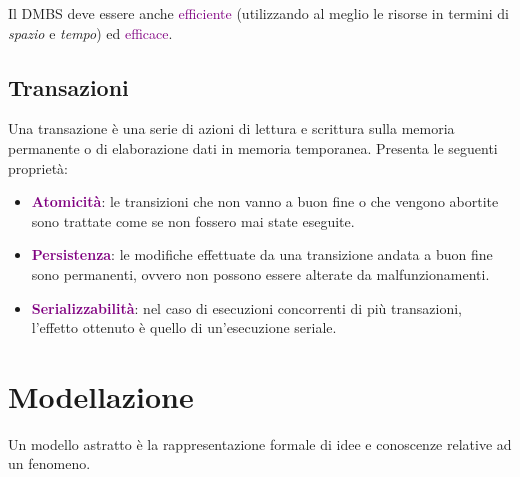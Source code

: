 Il DMBS deve essere anche \textcolor{purple}{efficiente} (utilizzando al meglio le risorse in termini di \emph{spazio} e \emph{tempo}) ed \textcolor{purple}{efficace}.

\subsection{Transazioni}

\begin{definition}[Transazione]
    Una transazione è una serie di azioni di lettura e scrittura sulla memoria permanente
    o di elaborazione dati in memoria temporanea. Presenta le seguenti proprietà:
    \begin{itemize}
        \item \textbf{\textcolor{purple}{Atomicità}}: le transizioni che non vanno a buon fine o che vengono abortite
            sono trattate come se non fossero mai state eseguite.
        \item \textbf{\textcolor{purple}{Persistenza}}: le modifiche effettuate da una transizione andata a buon fine sono permanenti,
            ovvero non possono essere alterate da malfunzionamenti.
        \item \textbf{\textcolor{purple}{Serializzabilità}}: nel caso di esecuzioni concorrenti di più transazioni, l'effetto ottenuto è quello di un'esecuzione seriale.
    \end{itemize}
\end{definition}

\section{Modellazione}
\begin{definition}
    Un modello astratto è la rappresentazione formale di idee e conoscenze relative ad un fenomeno.
\end{definition}


